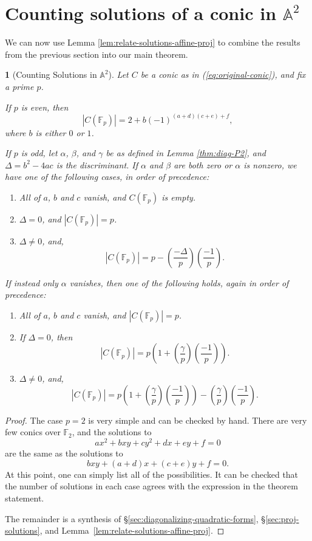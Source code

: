 \documentclass[10pt,a4paper]{amsart}
\numberwithin{equation}{section}
\numberwithin{figure}{section}
\numberwithin{table}{section}
\theoremstyle{definition}
\theoremstyle{plain}
\newtheorem{thm}{\protect\theoremname}[section]
\theoremstyle{remark}
\theoremstyle{plain}
\theoremstyle{definition}
\theoremstyle{plain}
\theoremstyle{plain}
\providecommand{\theoremname}{Theorem}
\newcommand{\legendre}[2]{\genfrac{(}{)}{}{}{#1}{#2}}
\newcommand{\A}{\mathbb{A}}
\newcommand{\F}{\mathbb{F}}
\begin{document}
	\section{Counting solutions of a conic in $\A^2$}
	\label{sec:affine-solutions}
	
	We can now use Lemma \ref{lem:relate-solutions-affine-proj} to combine the
	results from the previous section into our main theorem.
	
	\begin{thm}[Counting Solutions in $\A^2$]
		\label{thm:main-thm}
		Let $C$ be a conic as in (\ref{eq:original-conic}), and fix a prime $p$.
		
		If $p$ is even, then
		\begin{equation*}
		|C(\F_p)| = 2 + b(-1)^{(a + d)(c + e) + f},
		\end{equation*}
		where $b$ is either $0$ or $1$.
		
		If $p$ is odd, let $\alpha$, $\beta$, and $\gamma$ be as defined in 
		Lemma \ref{thm:diag-P2}, and $\Delta = b^2-4ac$ is the discriminant. 
		If $\alpha$ and $\beta$ are both zero or
		$\alpha$ is nonzero, we have one of the following cases, in order
		of precedence:
		\begin{enumerate}
			\item All of $a$, $b$ and $c$ vanish, and $C(\F_p)$ is empty.
			\item $\Delta = 0$, and $|C(\F_p)| = p$.
			\item $\Delta \neq 0$, and,
			\[ |C(\F_p)| = p - \legendre{-\Delta}{p}\legendre{-1}{p}. \]
		\end{enumerate}
		If instead only $\alpha$ vanishes, then one of the following holds, again
		in order of precedence:
		\begin{enumerate}
			\item All of $a$, $b$ and $c$ vanish, and $|C(\F_p)|=p$.
			\item If $\Delta = 0$, then
			\[ |C(\F_p)| = p\left(1 + \legendre{\gamma}{p}\legendre{-1}{p}\right). \]
			\item $\Delta \neq 0$, and,
			\[ |C(\F_p)| = p\left(1 + \legendre{\gamma}{p}\legendre{-1}{p}\right)
			- \legendre{\gamma}{p}\legendre{-1}{p}. \]
		\end{enumerate}
	\end{thm}
	\begin{proof} 
		The case $p=2$ is very simple and can be checked by hand. There are very few conics over $\F_2$, and the solutions to 
		\[ ax^2 + bxy + cy^2 + dx + ey + f = 0 \] 
		are the same as the solutions to 
		\[ bxy + (a+d)x + (c+e)y + f = 0.  \] 
		At this point, one can simply list all of the
		possibilities. It can be checked that the number of solutions in each case agrees with the expression in the theorem statement.
		
		The remainder is a synthesis of \S\ref{sec:diagonalizing-quadratic-forms}, 
		\S\ref{sec:proj-solutions}, and Lemma~\ref{lem:relate-solutions-affine-proj}.
	\end{proof}
	
\end{document}
